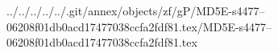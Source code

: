 ../../../../../.git/annex/objects/zf/gP/MD5E-s4477--06208f01db0acd17477038ccfa2fdf81.tex/MD5E-s4477--06208f01db0acd17477038ccfa2fdf81.tex